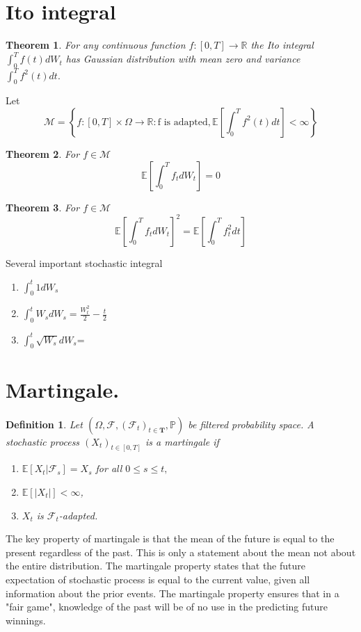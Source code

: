 \documentclass{book}
\newtheorem{definition}{Definition}[section]
\newtheorem{theorem}{Theorem}[section]
\begin{document}
\section{Ito integral}
\begin{theorem}
For any continuous  function $f\colon[0,T]\to\mathbb{R}$ the Ito integral $\int_{0}^{T}f(t)dW_{t}$ has Gaussian distribution with mean zero and variance $\int_{0}^{T}f^{2}(t)dt.$
\end{theorem}
Let 
$$
\mathcal{M}=\left\{f\colon[0,T]\times\varOmega\to\mathbb{R}\colon \text{f is adapted} ,\mathbb{E}\left[\int_{0}^{T}f^{2}(t)dt\right]<\infty\right\}
$$
\begin{theorem}
For $f\in\mathcal{M}$
$$
\mathbb{E}\left[\int_{0}^{T}f_{t}dW_{t}\right]=0
$$
\end{theorem}
\begin{theorem}
For $f\in\mathcal{M}$
$$
\mathbb{E}\left[\int_{0}^{T}f_{t}dW_{t}\right]^{2}=\mathbb{E}\left[\int_{0}^{T}f_{t}^{2}dt\right]
$$
\end{theorem}
Several important stochastic integral
\begin{enumerate}
\item $\int_{0}^{t}1dW_{s}$
\item $\int_{0}^{t}W_{s}dW_{s}=\frac{W_{t}^{2}}{2}-\frac{t}{2}$
\item $\int_{0}^{t}\sqrt{W_{s}}dW_{s}$=
\end{enumerate}

\section{Martingale.}
\begin{definition}
Let $(\varOmega,\mathcal{F},(\mathcal{F}_{t})_{t\in\mathbf{T}},\mathbb{P})$ be filtered probability space. A stochastic process $(X_{t})_{t\in[0,T]}$ is a martingale if
\begin{enumerate}
\item $\mathbb{E}[X_{t}|\mathcal{F}_{s}]=X_{s}$ for all $0\leq s\leq t,$
\item $\mathbb{E}[|X_{t}|]<\infty$,
\item $X_{t}$ is $\mathcal{F}_{t}$-adapted.
\end{enumerate}
\end{definition}
The key property of martingale is that the mean of the future is equal to the present regardless of the past. This is only a statement about the mean not about the entire distribution. The martingale property states that the future expectation of stochastic process is equal to the current value, given all information about the prior events. The martingale property ensures that in a "fair game", knowledge of the past will be of no use in the predicting future winnings.
\end{document}
